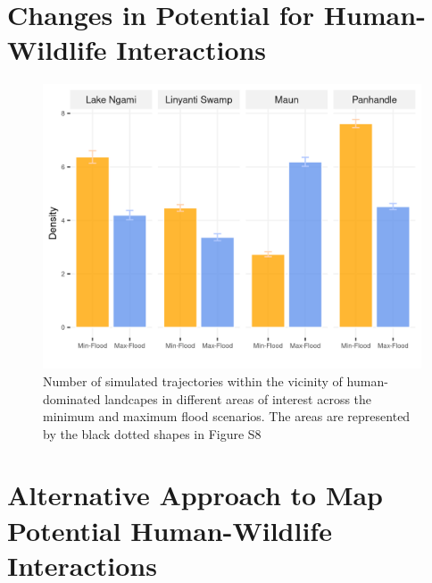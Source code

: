 \documentclass[abstract=on,10pt,a4paper,bibliography=totocnumbered]{article}
\begin{document}
\section{Changes in Potential for Human-Wildlife Interactions}
\begin{figure}[htbp]
  \begin{center}
  \includegraphics[width = \textwidth]{Figures/HWCDifferenceAOI.png}
  \caption{Number of simulated trajectories within the vicinity of
  human-dominated landcapes in different areas of interest across the minimum
  and maximum flood scenarios. The areas are represented by the black dotted
  shapes in Figure S8}
  \label{HWCDifference}
  \end{center}
\end{figure}

\newpage
\section{Alternative Approach to Map Potential Human-Wildlife Interactions}
\end{document}

